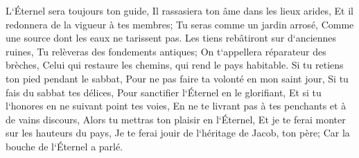 \verse L`Éternel sera toujours ton guide, Il rassasiera ton âme dans les lieux arides, Et il redonnera de la vigueur à tes membres; Tu seras comme un jardin arrosé, Comme une source dont les eaux ne tarissent pas. 
\verse Les tiens rebâtiront sur d`anciennes ruines, Tu relèveras des fondements antiques; On t`appellera réparateur des brèches, Celui qui restaure les chemins, qui rend le pays habitable. 
\verse Si tu retiens ton pied pendant le sabbat, Pour ne pas faire ta volonté en mon saint jour, Si tu fais du sabbat tes délices, Pour sanctifier l`Éternel en le glorifiant, Et si tu l`honores en ne suivant point tes voies, En ne te livrant pas à tes penchants et à de vains discours, 
\verse Alors tu mettras ton plaisir en l`Éternel, Et je te ferai monter sur les hauteurs du pays, Je te ferai jouir de l`héritage de Jacob, ton père; Car la bouche de l`Éternel a parlé. 

